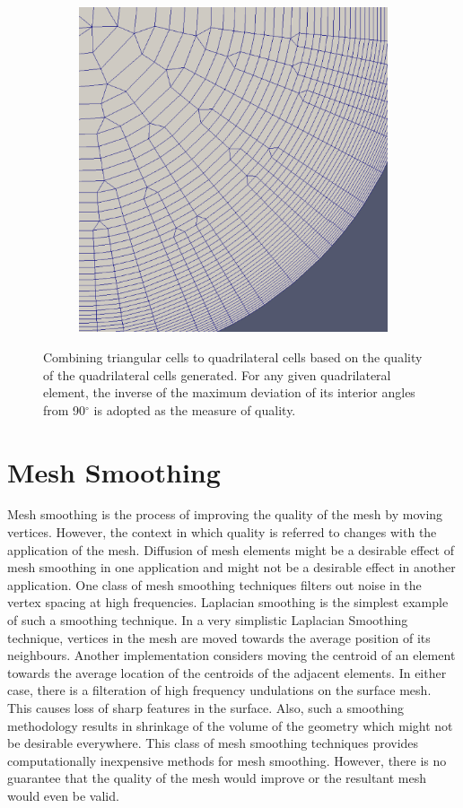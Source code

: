 \begin{figure}
\begin{subfigure}{0.5\textwidth}
\includegraphics[width =0.9\linewidth]{img/m2/combine-tris-to-quads/combineTrisToQuads2.eps}
\caption{}
\label{fig-triQuad2}
\end{subfigure}
\caption[Combining triangular cells to quadrilateral cells in EDAMSurf.]{Combining triangular cells to quadrilateral cells based on the quality of the quadrilateral cells generated. For any given quadrilateral element, the inverse of the maximum deviation of its interior angles from 90$^\circ$ is adopted as the measure of quality.}
\label{fig-triQuad}
\end{figure}

\section{Mesh Smoothing}

Mesh smoothing is the process of improving the quality of the mesh by moving vertices. However, the context in which quality is referred to changes with the application of the mesh. Diffusion of mesh elements might be a desirable effect of mesh smoothing in one application and might not be a desirable effect in another application. One class of mesh smoothing techniques filters out noise in the vertex spacing at high frequencies. Laplacian smoothing is the simplest example of such a smoothing technique. In a very simplistic Laplacian Smoothing technique, vertices in the mesh are moved towards the average position of its neighbours. Another implementation considers moving the centroid of an element towards the average location of the centroids of the adjacent elements. In either case, there is a filteration of high frequency undulations on the surface mesh. This causes loss of sharp features in the surface. Also, such a smoothing methodology results in shrinkage of the volume of the geometry which might not be desirable everywhere. This class of mesh smoothing techniques provides computationally inexpensive methods for mesh smoothing. However, there is no guarantee that the quality of the mesh would improve or the resultant mesh would even be valid.

